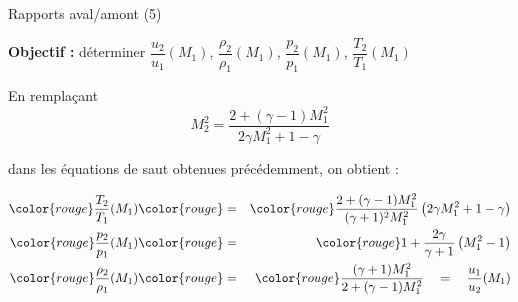 \begin{frame}{Rapports aval/amont (5)}

\small

\textbf{Objectif :} 
déterminer $\dfrac{u_2}{u_1}(M_1)$, $\dfrac{\rho_2}{\rho_1}(M_1)$, 
$\dfrac{p_2}{p_1}(M_1)$, $\dfrac{T_2}{T_1}(M_1)$

\bigskip

En remplaçant
\begin{equation*}
	M_2^2 = \frac{2+(\gamma-1)M_1^2}{2\gamma M_1^2 +1-\gamma}
\end{equation*}

dans les équations de saut obtenues précédemment, on obtient :

\begin{eqnarray}
	\color{rouge} \frac{T_2}{T_1}(M_1) 
	& 
	\color{rouge} = 
	& 
	\color{rouge} \frac{2 + (\gamma-1)M_1^2}{(\gamma+1)^2M_1^2}\left ( 2\gamma M_1^2 + 1 -\gamma\right )
	\\
	\color{rouge} \frac{p_2}{p_1}(M_1) 
	& 
	\color{rouge} = 
	& 
	\color{rouge} 1 + \frac{2\gamma}{\gamma+1}\left ( M_1^2 - 1\right )
	\\
	\color{rouge} \frac{\rho_2}{\rho_1} (M_1) 
	& 
	\color{rouge} = 
	& 
	\color{rouge} \frac{(\gamma+1) M_1^2}{2+(\gamma-1)M_1^2} \quad = \quad \frac{u_1}{u_2}(M_1)
\end{eqnarray}


\vspace{20mm}

\end{frame}

